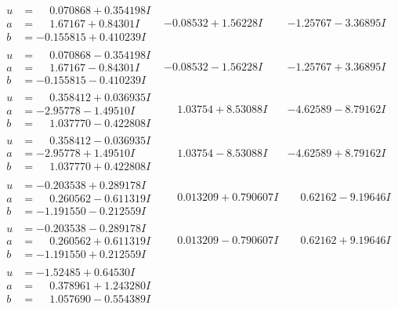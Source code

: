 \documentclass[1p]{elsarticle_modified}
\theoremstyle{definition}
\begin{document}
$$\begin{array}{c|c|c}
\begin{aligned}
u &= \phantom{-}0.070868 + 0.354198 I \\
a &= \phantom{-}1.67167 + 0.84301 I \\
b &= -0.155815 + 0.410239 I\end{aligned}
 & -0.08532 + 1.56228 I & -1.25767 - 3.36895 I \\ \hline\begin{aligned}
u &= \phantom{-}0.070868 - 0.354198 I \\
a &= \phantom{-}1.67167 - 0.84301 I \\
b &= -0.155815 - 0.410239 I\end{aligned}
 & -0.08532 - 1.56228 I & -1.25767 + 3.36895 I \\ \hline\begin{aligned}
u &= \phantom{-}0.358412 + 0.036935 I \\
a &= -2.95778 - 1.49510 I \\
b &= \phantom{-}1.037770 - 0.422808 I\end{aligned}
 & \phantom{-}1.03754 + 8.53088 I & -4.62589 - 8.79162 I \\ \hline\begin{aligned}
u &= \phantom{-}0.358412 - 0.036935 I \\
a &= -2.95778 + 1.49510 I \\
b &= \phantom{-}1.037770 + 0.422808 I\end{aligned}
 & \phantom{-}1.03754 - 8.53088 I & -4.62589 + 8.79162 I \\ \hline\begin{aligned}
u &= -0.203538 + 0.289178 I \\
a &= \phantom{-}0.260562 - 0.611319 I \\
b &= -1.191550 - 0.212559 I\end{aligned}
 & \phantom{-}0.013209 + 0.790607 I & \phantom{-}0.62162 - 9.19646 I \\ \hline\begin{aligned}
u &= -0.203538 - 0.289178 I \\
a &= \phantom{-}0.260562 + 0.611319 I \\
b &= -1.191550 + 0.212559 I\end{aligned}
 & \phantom{-}0.013209 - 0.790607 I & \phantom{-}0.62162 + 9.19646 I \\ \hline\begin{aligned}
u &= -1.52485 + 0.64530 I \\
a &= \phantom{-}0.378961 + 1.243280 I \\
b &= \phantom{-}1.057690 - 0.554389 I\end{aligned}

\end{array}$$
\end{document}
